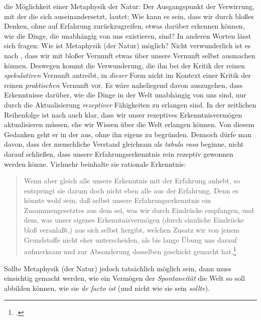 \begin{nummerierung}
 die Möglichkeit einer Metaphysik der Natur: Der Ausgangspunkt der Verwirrung, mit
der die  sich auseinandersetzt, lautet: Wie kann es
sein, dass wir durch bloßes Denken, ohne auf Erfahrung zurückzugreifen, etwas
darüber erkennen können, wie die Dinge, die unabhängig von uns existieren, sind?
In anderen Worten lässt sich fragen:
Wie ist Metaphysik (der Natur) möglich? Nicht verwunderlich ist es nach
, dass wir mit bloßer Vernunft etwas über unsere Vernunft
selbst ausmachen können. Deswegen kommt die Verwunderung, die ihn bei der Kritik
der reinen \emph{spekulativen} Vernunft antreibt, in \emph{dieser} Form nicht im
Kontext einer Kritik der reinen \emph{praktischen} Vernunft vor. Es wäre
naheliegend davon auszugehen, dass Erkenntnisse darüber, wie die Dinge in der Welt
unabhängig von uns sind, nur durch die Aktualisierung \emph{rezeptiver}
Fähigkeiten zu erlangen sind. In der zeitlichen Reihenfolge ist nach
 auch klar, dass wir unser rezeptives Erkenntnisvermögen
aktualisieren müssen, ehe wir Wissen über die Welt erlangen können. Von diesem
Gedanken geht er in der  aus, ohne ihn eigens
zu begründen. Dennoch dürfe man davon, dass der menschliche Verstand gleichsam
als \emph{tabula rasa} beginne, nicht darauf schließen, dass unsere
Erfahrungserkenntnis rein rezeptiv gewonnen werden könne. Vielmehr beinhalte sie
rationale Erkenntnis:
\begin{quote}
 Wenn aber gleich alle unsere Erkenntnis mit der Erfahrung anhebt, so entspringt
sie darum doch nicht eben alle aus der Erfahrung. Denn es könnte wohl sein, daß
selbst unsere Erfahrungserkenntnis ein Zusammengesetztes aus dem sei, was wir
durch Eindrücke empfangen, und dem, was unser eigenes Erkenntnisvermögen (durch
sinnliche Eindrücke bloß veranlaßt,) aus sich selbst hergibt, welchen Zusatz wir
von jenem Grundstoffe nicht eher unterscheiden, als bis lange Übung uns darauf
aufmerksam und zur Absonderung desselben geschickt gemacht
hat.\footnote{\cite[][B 1\,f.,]{Kant:KritikderreinenVernunft2003} \cite[][III:
27.14--21]{Kant:GesammelteWerke1900ff.}.}
\end{quote}
Sollte Metaphysik (der Natur) jedoch tatsächlich
möglich sein, dann muss einsichtig gemacht werden, wie ein Vermögen der
\emph{Spontaneität} die Welt so soll abbilden können, wie sie \emph{de facto
ist} (und nicht wie sie sein \emph{sollte}).


\end{nummerierung}
